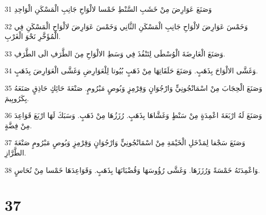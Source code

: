\par 31 وَصَنَعَ عَوَارِضَ مِنْ خَشَبِ السَّنْطِ خَمْسا لالْوَاحِ جَانِبِ الْمَسْكَنِ الْوَاحِدِ
\par 32 وَخَمْسَ عَوَارِضَ لالْوَاحِ جَانِبِ الْمَسْكَنِ الثَّانِي وَخَمْسَ عَوَارِضَ لالْوَاحِ الْمَسْكَنِ فِي الْمُؤَخَّرِ نَحْوَ الْغَرْبِ.
\par 33 وَصَنَعَ الْعَارِضَةَ الْوُسْطَى لِتَنْفُذَ فِي وَسَطِ الالْوَاحِ مِنَ الطَّرَفِ الَى الطَّرَفِ.
\par 34 وَغَشَّى الالْوَاحَ بِذَهَبٍ. وَصَنَعَ حَلَقَاتِهَا مِنْ ذَهَبٍ بُيُوتا لِلْعَوَارِضِ وَغَشَّى الْعَوَارِضَ بِذَهَبٍ.
\par 35 وَصَنَعَ الْحِجَابَ مِنْ اسْمَانْجُونِيٍّ وَارْجُوَانٍ وَقِرْمِزٍ وَبُوصٍ مَبْرُومٍ. صَنْعَةَ حَائِكٍ حَاذِقٍ صَنَعَهُ بِكَرُوبِيمَ.
\par 36 وَصَنَعَ لَهُ ارْبَعَةَ اعْمِدَةٍ مِنْ سَنْطٍ وَغَشَّاهَا بِذَهَبٍ. رُزَزُهَا مِنْ ذَهَبٍ. وَسَبَكَ لَهَا ارْبَعَ قَوَاعِدَ مِنْ فِضَّةٍ.
\par 37 وَصَنَعَ سَجْفا لِمَدْخَلِ الْخَيْمَةِ مِنْ اسْمَانْجُونِيٍّ وَارْجُوَانٍ وَقِرْمِزٍ وَبُوصٍ مَبْرُومٍ صَنْعَةَ الطَّرَّازِ.
\par 38 وَاعْمِدَتَهُ خَمْسَةً وَرُزَزَهَا. وَغَشَّى رُؤُوسَهَا وَقُضْبَانَهَا بِذَهَبٍ. وَقَوَاعِدَهَا خَمْسا مِنْ نُحَاسٍ.

\chapter{37}

